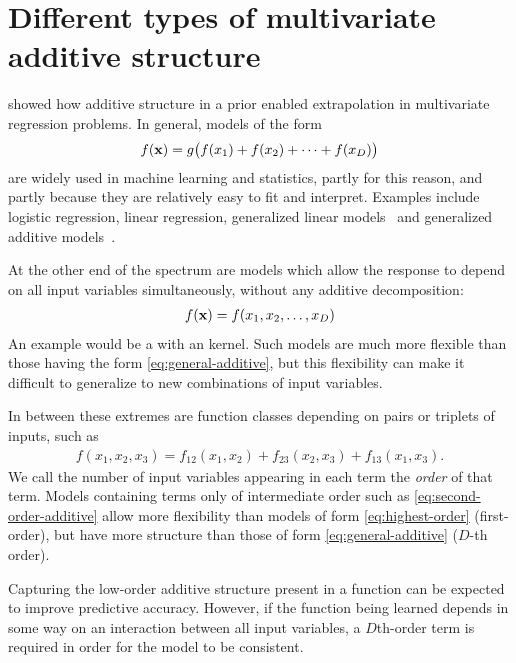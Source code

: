 \section{Different types of multivariate additive {\mbox structure}}
 showed how additive structure in a \gp{} prior enabled extrapolation in multivariate regression problems.
In general, models of the form
%
\begin{align}
f({\bf{x}}) = g \big( f(x_1) + f(x_2) + \dots + f(x_D) \big)
\label{eq:general-additive}
\end{align}
%
are widely used in machine learning and statistics, partly for this reason, and partly because they are relatively easy to fit and interpret.
Examples include logistic regression, linear regression, generalized linear models~\citep{nelder1972generalized} and generalized additive models~\citep{hastie1990generalized}.

At the other end of the spectrum are models which allow the response to depend on all input variables simultaneously, without any additive decomposition:
%
\begin{align}
f({\bf{x}}) = f(x_1, x_2, \dots, x_D)
\label{eq:highest-order}
\end{align}
%
An example would be a \gp{} with an \seard{} kernel.
Such models are much more flexible than those having the form \eqref{eq:general-additive}, but this flexibility can make it difficult to generalize to new combinations of input variables.

In between these extremes are function classes depending on pairs or triplets of inputs, such as
%
\begin{align}
f(x_1, x_2, x_3) = f_{12}(x_1, x_2) + f_{23}(x_2, x_3) + f_{13}(x_1, x_3) .
\label{eq:second-order-additive}
\end{align}
%
We call the number of input variables appearing in each term the \emph{order} of that term.
Models containing terms only of intermediate order such as \eqref{eq:second-order-additive} allow more flexibility than models of form \eqref{eq:highest-order} (first-order), but have more structure than those of form \eqref{eq:general-additive} ($D$-th order).

Capturing the low-order additive structure present in a function can be expected to improve predictive accuracy.
However, if the function being learned depends in some way on an interaction between all input variables, a $D$th-order term is required in order for the model to be consistent.

